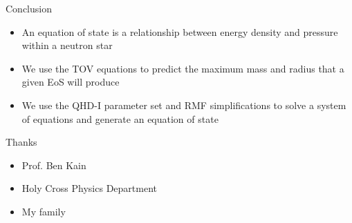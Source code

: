 \documentclass[]{beamer}
\begin{document}
    \begin{frame}{Conclusion}
        \begin{itemize}
            \item An equation of state is a relationship between energy density and pressure within a neutron star \pause
            \item We use the TOV equations to predict the maximum mass and radius that a given EoS will produce \pause
            \item We use the QHD-I parameter set and RMF simplifications to solve a system of equations and generate an equation of state
        \end{itemize}
    \end{frame}

    \begin{frame}{Thanks}
        \begin{itemize}
            \item Prof. Ben Kain \pause
            \item Holy Cross Physics Department \pause
            \item My family
        \end{itemize}
    \end{frame}
\end{document}
